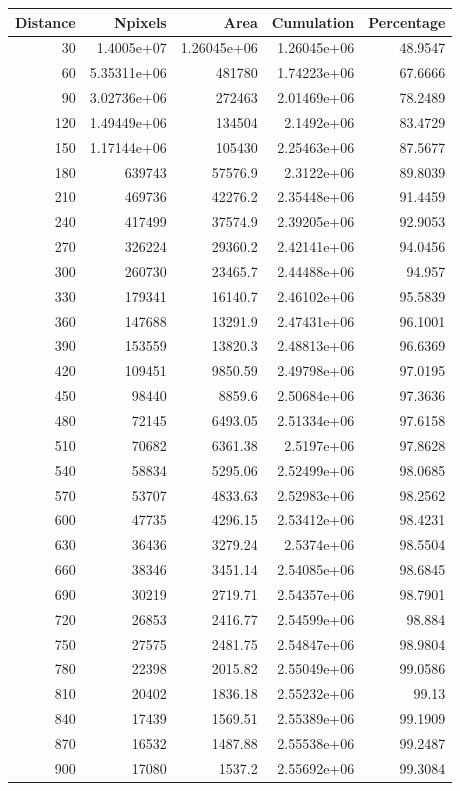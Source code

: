 \documentclass[paper=a4, 12pt, DIV=12]{scrartcl}
\begin{document}
\begin{center}
\begin{tabular}{rrrrr}
Distance & Npixels & Area & Cumulation & Percentage\\
\hline
30 & 1.4005e+07 & 1.26045e+06 & 1.26045e+06 & 48.9547\\
60 & 5.35311e+06 & 481780 & 1.74223e+06 & 67.6666\\
90 & 3.02736e+06 & 272463 & 2.01469e+06 & 78.2489\\
120 & 1.49449e+06 & 134504 & 2.1492e+06 & 83.4729\\
150 & 1.17144e+06 & 105430 & 2.25463e+06 & 87.5677\\
180 & 639743 & 57576.9 & 2.3122e+06 & 89.8039\\
210 & 469736 & 42276.2 & 2.35448e+06 & 91.4459\\
240 & 417499 & 37574.9 & 2.39205e+06 & 92.9053\\
270 & 326224 & 29360.2 & 2.42141e+06 & 94.0456\\
300 & 260730 & 23465.7 & 2.44488e+06 & 94.957\\
330 & 179341 & 16140.7 & 2.46102e+06 & 95.5839\\
360 & 147688 & 13291.9 & 2.47431e+06 & 96.1001\\
390 & 153559 & 13820.3 & 2.48813e+06 & 96.6369\\
420 & 109451 & 9850.59 & 2.49798e+06 & 97.0195\\
450 & 98440 & 8859.6 & 2.50684e+06 & 97.3636\\
480 & 72145 & 6493.05 & 2.51334e+06 & 97.6158\\
510 & 70682 & 6361.38 & 2.5197e+06 & 97.8628\\
540 & 58834 & 5295.06 & 2.52499e+06 & 98.0685\\
570 & 53707 & 4833.63 & 2.52983e+06 & 98.2562\\
600 & 47735 & 4296.15 & 2.53412e+06 & 98.4231\\
630 & 36436 & 3279.24 & 2.5374e+06 & 98.5504\\
660 & 38346 & 3451.14 & 2.54085e+06 & 98.6845\\
690 & 30219 & 2719.71 & 2.54357e+06 & 98.7901\\
720 & 26853 & 2416.77 & 2.54599e+06 & 98.884\\
750 & 27575 & 2481.75 & 2.54847e+06 & 98.9804\\
780 & 22398 & 2015.82 & 2.55049e+06 & 99.0586\\
810 & 20402 & 1836.18 & 2.55232e+06 & 99.13\\
840 & 17439 & 1569.51 & 2.55389e+06 & 99.1909\\
870 & 16532 & 1487.88 & 2.55538e+06 & 99.2487\\
900 & 17080 & 1537.2 & 2.55692e+06 & 99.3084\\
\end{tabular}
\end{center}
\end{document}
